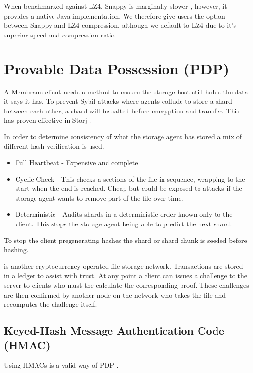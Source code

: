 \documentclass[11pt, a4paper, twocolumn, twoside]{report}
\begin{document}
When benchmarked against LZ4, Snappy is marginally slower \citep{vorontsov2015compression}, however, it provides a native Java implementation. We therefore give users the option between Snappy and LZ4 compression, although we default to LZ4 due to it's superior speed and compression ratio. \citep{lz42017lz4}

\section{Provable Data Possession (PDP)} \label{sec:poo}

A Membrane client needs a method to ensure the storage host still holds the data it says it has. To prevent Sybil attacks where agents collude to store a shard between each other, a shard will be salted before encryption and transfer. This has proven effective in Storj \citep{Wilkinson14storja}.

In order to determine consistency of what the storage agent has stored a mix of different hash verification is used.
\begin{itemize}
 \item Full Heartbeat - Expensive and complete
 \item Cyclic Check - This checks a sections of the file in sequence, wrapping to the start when the end is reached. Cheap but could be exposed to attacks if the storage agent wants to remove part of the file over time.
 \item Deterministic - Audits shards in a deterministic order known only to the client. This stops the storage agent being able to predict the next shard.
\end{itemize}

To stop the client pregenerating hashes the shard or shard chunk is seeded before hashing.

\cite{filecoin2014filecoin} is another cryptocurrency operated file storage network. Transactions are stored in a ledger to assist with trust. At any point a client can issues a challenge to the server to clients who must the calculate the corresponding proof. These challenges are then confirmed by another node on the network who takes the file and recomputes the challenge itself.

\subsection{Keyed-Hash Message Authentication Code (HMAC)}

Using HMACs is a valid way of PDP \citep{ateniese2011remote}.
\end{document}
